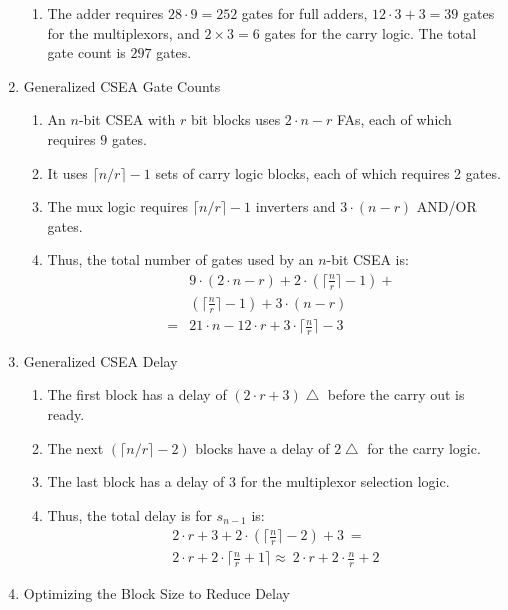 \documentclass[times, twocolumn, 10pt]{article}
\begin{document}
\begin{enumerate}
\begin{enumerate}
  \item The adder requires $28 \cdot 9 = 252$ gates for full adders, $12
  \cdot 3 + 3 = 39$
    gates for the multiplexors, and $2 \times 3 = 6$ gates for the carry
  logic.  The total gate count is $297$ gates. 
  \end{enumerate}
\item Generalized  CSEA Gate Counts
  \begin{enumerate}
  \item An $n$-bit CSEA with $r$ bit blocks uses $2 \cdot n - r$ FAs, each of
  which requires $9$ gates. 
  \item It uses $\lceil n/r \rceil - 1$ sets of carry logic blocks, each 
    of which requires 2 gates. 
  \item The mux logic requires $\lceil n/r \rceil - 1$ inverters and 
    $3 \cdot (n - r)$ AND/OR gates. 
  \item Thus, the total number of gates used by an $n$-bit CSEA is:
    \begin{eqnarray*}
      & & 9 \cdot (2 \cdot n - r) + 2 \cdot (\lceil \frac{n}{r} \rceil - 1) + \\
      & & (\lceil \frac{n}{r} \rceil - 1) + 3 \cdot (n - r) \\ 
      & = & 21 \cdot n - 12 \cdot r + 3 \cdot \lceil \frac{n}{r} \rceil - 3 
    \end{eqnarray*}
  \end{enumerate}
\item Generalized  CSEA Delay
  \begin{enumerate}
  \item The first block has a delay of $(2 \cdot r + 3) \bigtriangleup$
  before the carry out is ready. 
  \item The next $(\lceil n/r \rceil - 2)$ blocks have a delay of 
    $2 \bigtriangleup$  for the carry logic. 
  \item The last block has a delay of 3 for the multiplexor selection logic.
  \item Thus, the total delay is for $s_{n-1}$ is:
    \begin{eqnarray*}
      2 \cdot r + 3  + 2 \cdot (\lceil \frac{n}{r} \rceil - 2) + 3 \
      = \\
      2 \cdot r + 2 \cdot \lceil \frac{n}{r} + 1 \rceil \approx \
      2 \cdot r + 2 \cdot \frac{n}{r} + 2
    \end{eqnarray*}
  \end{enumerate}
\item Optimizing the Block Size to Reduce Delay

\end{enumerate}
\end{document}
